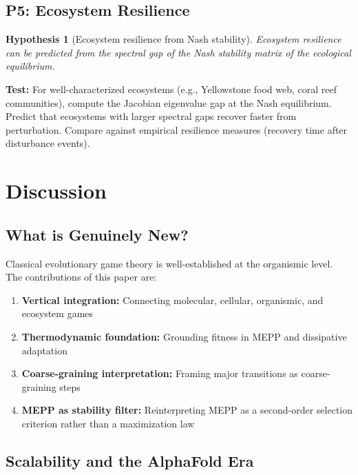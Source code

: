\documentclass[12pt,a4paper]{article}
\newtheorem{hypothesis}{Hypothesis}
\theoremstyle{remark}
\begin{document}
\subsection{P5: Ecosystem Resilience}

\begin{hypothesis}[Ecosystem resilience from Nash stability]
Ecosystem resilience can be predicted from the spectral gap of the Nash stability matrix of the ecological equilibrium.
\end{hypothesis}

\textbf{Test:} For well-characterized ecosystems (e.g., Yellowstone food web, coral reef communities), compute the Jacobian eigenvalue gap at the Nash equilibrium. Predict that ecosystems with larger spectral gaps recover faster from perturbation. Compare against empirical resilience measures (recovery time after disturbance events).

\section{Discussion}
\label{sec:discussion}

\subsection{What is Genuinely New?}

Classical evolutionary game theory is well-established at the organismic level. The contributions of this paper are:
\begin{enumerate}
    \item \textbf{Vertical integration:} Connecting molecular, cellular, organismic, and ecosystem games
    \item \textbf{Thermodynamic foundation:} Grounding fitness in MEPP and dissipative adaptation
    \item \textbf{Coarse-graining interpretation:} Framing major transitions as coarse-graining steps
    \item \textbf{MEPP as stability filter:} Reinterpreting MEPP as a second-order selection criterion rather than a maximization law
\end{enumerate}

\subsection{Scalability and the AlphaFold Era}
\end{document}
